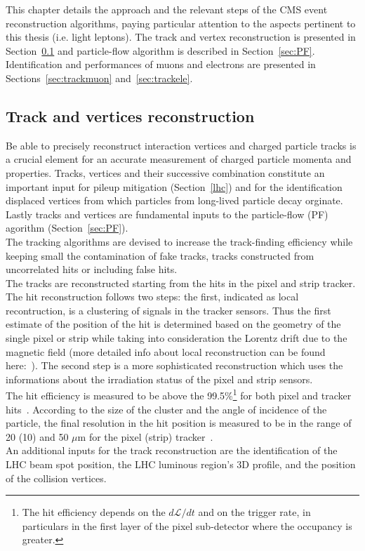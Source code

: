 This chapter details the approach and the relevant steps of the CMS
event reconstruction algorithms, paying particular attention to the
aspects pertinent to this thesis (i.e. light leptons). The track and vertex reconstruction 
is presented in Section~\ref{sec:trackvertex} and particle-flow
algorithm is described in Section~\ref{sec:PF}. Identification and
performances of muons and electrons are presented in
Sections~\ref{sec:trackmuon} and~\ref{sec:trackele}.


\subsection{Track and vertices reconstruction}\label{sec:trackvertex}

Be able to precisely reconstruct interaction vertices and charged
particle tracks is a crucial element for an accurate measurement of
charged particle momenta and properties. Tracks, vertices and their
successive combination constitute an important input for pileup
mitigation (Section~\ref{lhc}) and for the
identification displaced vertices from which particles from long-lived
particle decay orginate.
Lastly tracks and vertices are fundamental inputs to the particle-flow (PF) agorithm (Section~\ref{sec:PF}).\\
The tracking algorithms are devised to
increase the track-finding efficiency while keeping small the
contamination of fake tracks, \ie tracks constructed from uncorrelated hits or
including false hits.\\
 
The tracks are reconstructed starting from the hits in the pixel and
strip tracker. The hit reconstruction follows two steps: the first,
indicated as local recontruction, is a clustering of signals in the
tracker sensors. Thus 
the first estimate of the
position of the hit is determined based on the geometry of the single
pixel or strip while taking into consideration the Lorentz drift due
to the magnetic field (more detailed info about local reconstruction
can be found here:~\cite{CMS:particleflow}). The second step is a more
sophisticated reconstruction which uses the informations about the
irradiation status of the pixel and strip sensors. \\
The hit efficiency is measured to be above the 99.5\%\footnote{The hit
  efficiency depends on the
$d\mathcal{L}/dt$ and on the trigger rate, in particulars in
the first layer of the pixel sub-detector where the occupancy is greater.} for both pixel
and tracker hits~\cite{CMS:particleflow}. According to the size of the
cluster and the angle of
incidence of the particle, the final resolution in the
hit position is measured to be in the range of 20 (10) and 50 $\mu$m
for the pixel (strip) tracker~\cite{CMS:particleflow}.\\
An additional inputs for the track reconstruction are the identification
of the LHC beam spot position, \ie the LHC luminous region's
3D profile, and the position of the collision
vertices. 

